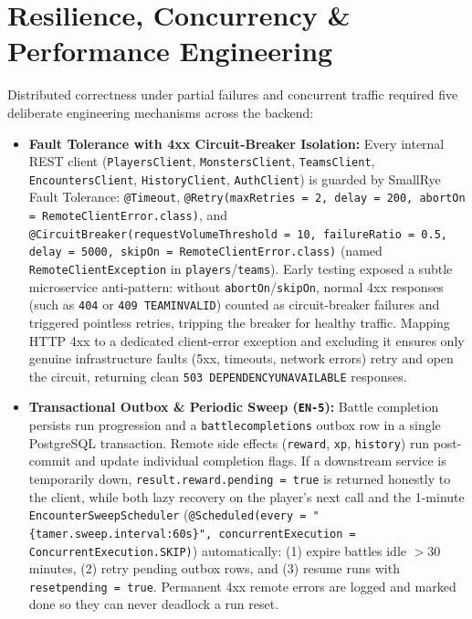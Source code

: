\documentclass[10.5pt,a4paper]{article}
\DeclareRobustCommand{\code}[1]{\begingroup\def\_{\textunderscore\allowbreak}\texttt{#1}\endgroup}
\begin{document}
\section{Resilience, Concurrency \& Performance Engineering}
\label{sec:resilience}

Distributed correctness under partial failures and concurrent traffic required five deliberate engineering mechanisms across the backend:

\begin{itemize}
  \item \textbf{Fault Tolerance with 4xx Circuit-Breaker Isolation:} Every internal REST client (\code{PlayersClient}, \code{MonstersClient}, \code{TeamsClient}, \code{EncountersClient}, \code{HistoryClient}, \code{AuthClient}) is guarded by SmallRye Fault Tolerance: \code{@Timeout}, \code{@Retry(maxRetries = 2, delay = 200, abortOn = RemoteClientError.class)}, and \code{@CircuitBreaker(requestVolumeThreshold = 10, failureRatio = 0.5, delay = 5000, skipOn = RemoteClientError.class)} (named \code{RemoteClientException} in \code{players}/\code{teams}). Early testing exposed a subtle microservice anti-pattern: without \code{abortOn}/\code{skipOn}, normal 4xx responses (such as \code{404} or \code{409 TEAM\_INVALID}) counted as circuit-breaker failures and triggered pointless retries, tripping the breaker for healthy traffic. Mapping HTTP 4xx to a dedicated client-error exception and excluding it ensures only genuine infrastructure faults (5xx, timeouts, network errors) retry and open the circuit, returning clean \code{503 DEPENDENCY\_UNAVAILABLE} responses.
  \item \textbf{Transactional Outbox \& Periodic Sweep (\code{EN-5}):} Battle completion persists run progression and a \code{battle\_completions} outbox row in a single PostgreSQL transaction. Remote side effects (\code{reward}, \code{xp}, \code{history}) run post-commit and update individual completion flags. If a downstream service is temporarily down, \code{result.reward.pending = true} is returned honestly to the client, while both lazy recovery on the player's next call and the 1-minute \code{EncounterSweepScheduler} (\code{@Scheduled(every = "\{tamer.sweep.interval:60s\}", concurrentExecution = ConcurrentExecution.SKIP)}) automatically: (1) expire battles idle $>30$ minutes, (2) retry pending outbox rows, and (3) resume runs with \code{reset\_pending = true}. Permanent 4xx remote errors are logged and marked done so they can never deadlock a run reset.

\end{itemize}
\end{document}
